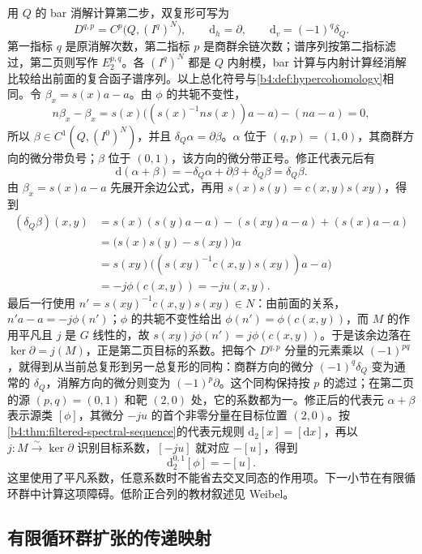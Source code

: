 \ProseParagraphBreak
用 \(Q\) 的 bar 消解计算第二步，双复形可写为
\[
	D^{q,p}=C^p\bigl(Q,(I^q)^N\bigr),\qquad \mathrm d_h=\partial,\qquad \mathrm d_v=(-1)^q\delta_Q.
\]
第一指标 \(q\) 是原消解次数，第二指标 \(p\) 是商群余链次数；谱序列按第二指标滤过，第二页则写作 \(E_2^{p,q}\)。各 \((I^q)^N\) 都是 \(Q\) 内射模，bar 计算与内射计算经消解比较给出前面的复合函子谱序列。以上总化符号与\cref{b4:def:hypercohomology}相同。令 \(\beta_x=s(x)a-a\)。由 \(\phi\) 的共轭不变性，
\[
	n\beta_x-\beta_x =s(x)\bigl((s(x)^{-1}ns(x))a-a\bigr)-(na-a)=0,
\]
所以 \(\beta\in C^1(Q,(I^0)^N)\)，并且 \(\delta_Q\alpha=\partial\beta\)。\(\alpha\) 位于 \((q,p)=(1,0)\)，其商群方向的微分带负号；\(\beta\) 位于 \((0,1)\)，该方向的微分带正号。修正代表元后有
\[
	\mathrm d(\alpha+\beta) =-\delta_Q\alpha+\partial\beta+\delta_Q\beta =\delta_Q\beta.
\]
由 \(\beta_x=s(x)a-a\) 先展开余边公式，再用 \(s(x)s(y)=c(x,y)s(xy)\)，得到
\[
	\begin{aligned}
		(\delta_Q\beta)(x,y) &=s(x)(s(y)a-a)-(s(xy)a-a)+(s(x)a-a)\\
		&=\bigl(s(x)s(y)-s(xy)\bigr)a\\
		&=s(xy)\bigl((s(xy)^{-1}c(x,y)s(xy))a-a\bigr)\\
		&=-j\phi(c(x,y))=-j u(x,y).
	\end{aligned}
\]
最后一行使用 \(n'=s(xy)^{-1}c(x,y)s(xy)\in N\)：由前面的关系，\(n' a-a=-j\phi(n')\)；\(\phi\) 的共轭不变性给出 \(\phi(n')=\phi(c(x,y))\)，而 \(M\) 的作用平凡且 \(j\) 是 \(G\) 线性的，故 \(s(xy)j\phi(n')=j\phi(c(x,y))\)。于是该余边落在 \(\ker\partial=j(M)\)，正是第二页目标的系数。把每个 \(D^{q,p}\) 分量的元素乘以 \((-1)^{pq}\)，就得到从当前总复形到另一总复形的同构：商群方向的微分 \((-1)^q\delta_Q\) 变为通常的 \(\delta_Q\)，消解方向的微分则变为 \((-1)^p\partial\)。这个同构保持按 \(p\) 的滤过；在第二页的源 \((p,q)=(0,1)\) 和靶 \((2,0)\) 处，它的系数都为一。修正后的代表元 \(\alpha+\beta\) 表示源类 \([\phi]\)，其微分 \(-ju\) 的首个非零分量在目标位置 \((2,0)\)。按\cref{b4:thm:filtered-spectral-sequence}的代表元规则 \(\mathrm d_2[x]=[\mathrm dx]\)，再以 \(j:M\xrightarrow{\sim}\ker\partial\) 识别目标系数，\([-ju]\) 就对应 \(-[u]\)，得到
\[
	\mathrm d_2^{0,1}[\phi]=-[u].
\]
这里使用了平凡系数，任意系数时不能省去交叉同态的作用项。下一小节在有限循环群中计算这项障碍。低阶正合列的教材叙述见 Weibel\cite[Low Degree Terms 6.8.3]{Weibel1994HomologicalAlgebra}。

\subsection{有限循环群扩张的传递映射}
\label{b4:subsec:1504:04}

